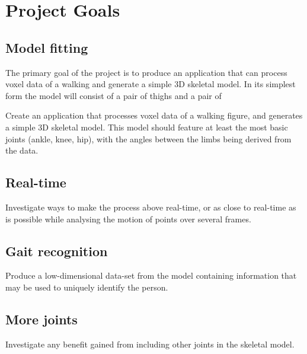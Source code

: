 \section{Project Goals}

\subsection{Model fitting}

The primary goal of the project is to produce an application that can process voxel data of a walking and generate a simple 3D skeletal model.
In its simplest form the model will consist of a pair of thighs and a pair of 

Create an application that processes voxel data of a walking figure, and generates a simple 3D skeletal model.
This model should feature at least the most basic joints (ankle, knee, hip),
with the angles between the limbs being derived from the data.

\subsection{Real-time}

Investigate ways to make the process above real-time,
or as close to real-time as is possible while analysing the motion of points over several frames.

\subsection{Gait recognition}

Produce a low-dimensional data-set from the model containing information that may be used to uniquely identify the person.

\subsection{More joints}

Investigate any benefit gained from including other joints in the skeletal model.
